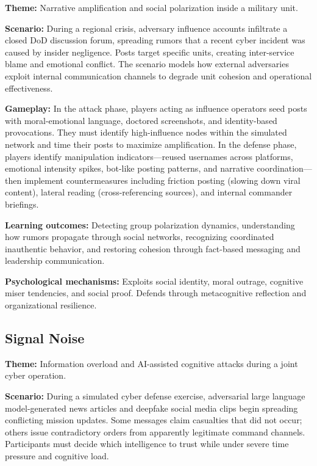 \documentclass[12pt]{article}
\begin{document}
\textbf{Theme:} Narrative amplification and social polarization inside a military unit.

\textbf{Scenario:} During a regional crisis, adversary influence accounts infiltrate a closed DoD discussion forum, spreading rumors that a recent cyber incident was caused by insider negligence. Posts target specific units, creating inter-service blame and emotional conflict. The scenario models how external adversaries exploit internal communication channels to degrade unit cohesion and operational effectiveness.

\textbf{Gameplay:} In the attack phase, players acting as influence operators seed posts with moral-emotional language, doctored screenshots, and identity-based provocations. They must identify high-influence nodes within the simulated network and time their posts to maximize amplification. In the defense phase, players identify manipulation indicators---reused usernames across platforms, emotional intensity spikes, bot-like posting patterns, and narrative coordination---then implement countermeasures including friction posting (slowing down viral content), lateral reading (cross-referencing sources), and internal commander briefings.

\textbf{Learning outcomes:} Detecting group polarization dynamics, understanding how rumors propagate through social networks, recognizing coordinated inauthentic behavior, and restoring cohesion through fact-based messaging and leadership communication.

\textbf{Psychological mechanisms:} Exploits social identity, moral outrage, cognitive miser tendencies, and social proof. Defends through metacognitive reflection and organizational resilience.

\subsection{Signal Noise}

\textbf{Theme:} Information overload and AI-assisted cognitive attacks during a joint cyber operation.

\textbf{Scenario:} During a simulated cyber defense exercise, adversarial large language model-generated news articles and deepfake social media clips begin spreading conflicting mission updates. Some messages claim casualties that did not occur; others issue contradictory orders from apparently legitimate command channels. Participants must decide which intelligence to trust while under severe time pressure and cognitive load.
\end{document}
